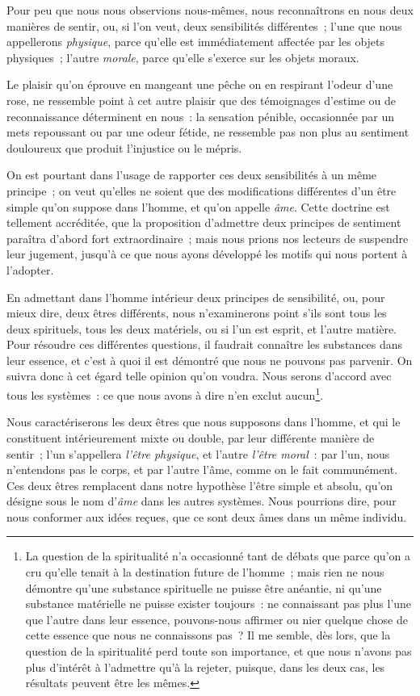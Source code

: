 \documentclass[french,twoside]{book} %
\newcommand\chaptercont{} %
\newcommand\chapterclose{} %
\begin{document}
\chaptercont
\noindent Pour peu que nous nous observions nous-mêmes, nous reconnaîtrons en nous deux manières de sentir, ou, si l’on veut, deux sensibilités différentes ; l’une que nous appellerons {\itshape physique}, parce qu’elle est immédiatement affectée par les objets physiques ; l’autre {\itshape morale}, parce qu’elle s’exerce sur les objets moraux.\par
Le plaisir qu’on éprouve en mangeant une pêche on en respirant l’odeur d’une rose, ne ressemble point à cet autre plaisir que des témoignages d’estime ou de reconnaissance déterminent en nous : la sensation pénible, occasionnée par un mets repoussant ou par une odeur fétide, ne ressemble pas non plus au sentiment douloureux que produit l’injustice ou le mépris.\par
On est pourtant dans l’usage de rapporter ces deux sensibilités à un même principe ; on veut qu’elles ne soient que des modifications différentes d’un être simple qu’on suppose dans l’homme, et qu’on appelle {\itshape âme}. Cette doctrine est tellement accréditée, que la proposition d’admettre deux principes de sentiment paraîtra d’abord fort extraordinaire ; mais nous prions nos lecteurs de suspendre leur jugement, jusqu’à ce que nous ayons développé les motifs qui nous portent à l’adopter.\par
En admettant dans l’homme intérieur deux principes de sensibilité, ou, pour mieux dire, deux êtres différents, nous n’examinerons point s’ils sont tous les deux spirituels, tous les deux matériels, ou si l’un est esprit, et l’autre matière. Pour résoudre ces différentes questions, il faudrait connaître les substances dans leur essence, et c’est à quoi il est démontré que nous ne pouvons pas parvenir. On suivra donc à cet égard telle opinion qu’on voudra. Nous serons d’accord avec tous les systèmes : ce que nous avons à dire n’en exclut aucun\footnote{La question de la spiritualité n’a occasionné tant de débats que parce qu’on a cru qu’elle tenait à la destination future de l’homme ; mais rien ne nous démontre qu’une substance spirituelle ne puisse être anéantie, ni qu’une substance matérielle ne puisse exister toujours : ne connaissant pas plus l’une que l’autre dans leur essence, pouvons-nous affirmer ou nier quelque chose de cette essence que nous ne connaissons pas ? Il me semble, dès lors, que la question de la spiritualité perd toute son importance, et que nous n’avons pas plus d’intérêt à l’admettre qu’à la rejeter, puisque, dans les deux cas, les résultats peuvent être les mêmes.}.\par
Nous caractériserons les deux êtres que nous supposons dans l’homme, et qui le constituent intérieurement mixte ou double, par leur différente manière de sentir ; l’un s’appellera {\itshape l’être physique}, et l’autre {\itshape l’être moral} : par l’un, nous n’entendons pas le corps, et par l’autre l’âme, comme on le fait communément. Ces deux êtres remplacent dans notre hypothèse l’être simple et absolu, qu’on désigne sous le nom d’{\itshape âme} dans les autres systèmes. Nous pourrions dire, pour nous conformer aux idées reçues, que ce sont deux âmes dans un même individu.
\chapterclose
\end{document}

